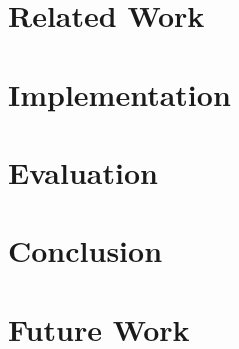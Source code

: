 







\cleardoublepage{}


\tableofcontents

\chapter{}
\label{introduction}


\chapter{Related Work}
\label{relatedwork}


\chapter{Implementation}
\label{implementation}


\chapter{Evaluation}
\label{evaluation}


\chapter{Conclusion}
\label{conclusion}


\chapter{Future Work}
\label{future_work}


\cleardoublepage{}
\thispagestyle{empty}
\listoffigures

